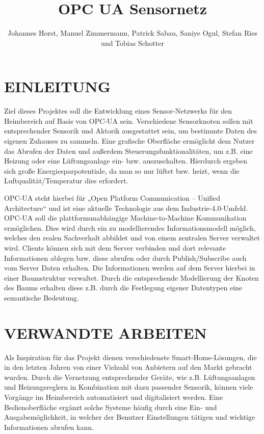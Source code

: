 \documentclass[letterpaper, 10 pt, conference]{ieeeconf}  %
\title{\LARGE \bf
OPC UA Sensornetz
}
\author{Johannes Horst, Manuel Zimmermann, Patrick Sabau, Saniye Ogul, Stefan Ries und Tobias Schotter}%
\begin{document}
\maketitle
\thispagestyle{empty}
\pagestyle{empty}

\section{EINLEITUNG}

Ziel dieses Projektes soll die Entwicklung eines Sensor-Netzwerks für den Heimbereich auf Basis von OPC-UA sein. 
Verschiedene Sensorknoten sollen mit entsprechender Sensorik und Aktorik ausgestattet sein, um bestimmte Daten des eigenen Zuhauses zu sammeln. 
Eine grafische Oberfläche ermöglicht dem Nutzer das Abrufen der Daten und außerdem Steuerungsfunktionalitäten, um z.B. eine Heizung oder eine Lüftungsanlage ein- bzw. auszuschalten. 
Hierdurch ergeben sich große Energiesparpotentiale, da man so nur lüftet bzw. heizt, wenn die Luftqualität/Temperatur dies erfordert.  

OPC-UA steht hierbei für „Open Platform Communication – Unified Architecture“ und ist eine aktuelle Technologie aus dem Industrie-4.0-Umfeld. OPC-UA soll die plattformunabhängige Machine-to-Machine Kommunikation ermöglichen. 
Dies wird durch ein zu modellierendes Informationsmodell möglich, welches den realen Sachverhalt abbildet und von einem zentralen Server verwaltet wird. 
Clients können sich mit dem Server verbinden und dort relevante Informationen ablegen bzw. diese abrufen oder durch Publish/Subscribe auch vom Server Daten erhalten. Die Informationen werden auf dem Server hierbei in einer Baumstruktur verwaltet. 
Durch die entsprechende Modellierung der Knoten des Baums erhalten diese z.B. durch die Festlegung eigener Datentypen eine semantische Bedeutung.



\section{VERWANDTE ARBEITEN}

Als Inspiration für das Projekt dienen verschiedenste Smart-Home-Lösungen, die in den letzten Jahren von einer Vielzahl von Anbietern auf den Markt gebracht wurden. 
Durch die Vernetzung entsprechender Geräte, wie z.B. Lüftungsanlagen und Heizungsreglern in Kombination mit dazu passender Sensorik, können viele Vorgänge im Heimbereich automatisiert und digitalisiert werden. 
Eine Bedienoberfläche ergänzt solche Systeme häufig durch eine Ein- und Ausgabemöglichkeit, in welcher der Benutzer Einstellungen tätigen und wichtige Informationen abrufen kann.
\end{document}
